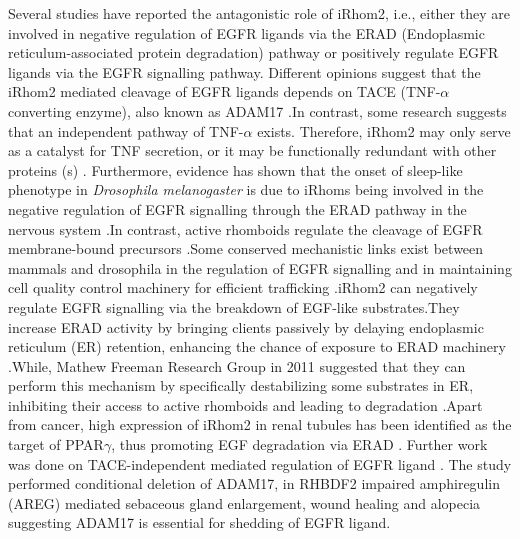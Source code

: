 \documentclass[fleqn,10pt,lineno]{wlpeerj}
\begin{document}
Several studies have reported the antagonistic role of iRhom2, i.e., either they are involved in negative regulation of EGFR ligands via the ERAD (Endoplasmic reticulum-associated protein degradation) pathway or positively regulate EGFR ligands via the EGFR signalling pathway. Different opinions suggest that the iRhom2 mediated cleavage of EGFR ligands depends on TACE (TNF-$\alpha$ converting enzyme), also known as ADAM17 \citep{Hosur2014,Kunzel2018}.In contrast, some research suggests that an independent pathway of TNF-$\alpha$ exists. Therefore, iRhom2 may only serve as a catalyst for TNF secretion, or it may be functionally redundant with other proteins (s) \citep{Siggs2014}. Furthermore, evidence has shown that the onset of sleep-like phenotype in \textit{Drosophila melanogaster} is due to iRhoms being involved in the negative regulation of EGFR signalling through the ERAD pathway in the nervous system \citep{Lee2016}.In contrast, active rhomboids regulate the cleavage of EGFR membrane-bound precursors \citep{Adrain2012}.Some conserved mechanistic links exist between mammals and drosophila in the regulation of EGFR signalling and in maintaining cell quality control machinery for efficient trafficking \citep{Etheridge2013}.iRhom2 can negatively regulate EGFR signalling via the breakdown of EGF-like substrates.They increase ERAD activity by bringing clients passively by delaying endoplasmic reticulum (ER) retention, enhancing the chance of exposure to ERAD machinery \citep{Lee2016}.While, Mathew Freeman Research Group in 2011 suggested that they can perform this mechanism by specifically destabilizing some substrates in ER, inhibiting their access to active rhomboids and leading to degradation \citep{Zettl2011}.Apart from cancer, high expression of iRhom2 in renal tubules has been identified as the target of PPAR$\gamma$, thus promoting EGF degradation via ERAD \citep{Lyu2018}. Further work was done on TACE-independent mediated regulation of EGFR ligand \citep{Hosur2018}. The study performed conditional deletion of ADAM17, in RHBDF2 impaired amphiregulin (AREG) mediated sebaceous gland enlargement, wound healing and alopecia suggesting ADAM17 is essential for shedding of EGFR ligand.
\end{document}
